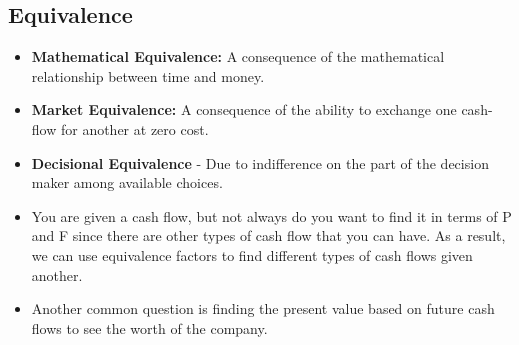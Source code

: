 \subsection{Equivalence}

\begin{definition}
    \begin{itemize}
        \item \textbf{Mathematical Equivalence:} A consequence of the mathematical relationship between time and money.
        \item \textbf{Market Equivalence:} A consequence of the ability to exchange one cash-flow for another at zero cost.
        \item \textbf{Decisional Equivalence} - Due to indifference on the part of the decision maker among available choices.
    \end{itemize}    
\end{definition}

\begin{intuition}
    \begin{itemize}
        \item You are given a cash flow, but not always do you want to find it in terms of P and F since there are other types of cash flow that you can have. As a result, we can use equivalence factors to find different types of cash flows given another. 
        \item Another common question is finding the present value based on future cash flows to see the worth of the company.
    \end{itemize}    
\end{intuition}
    
